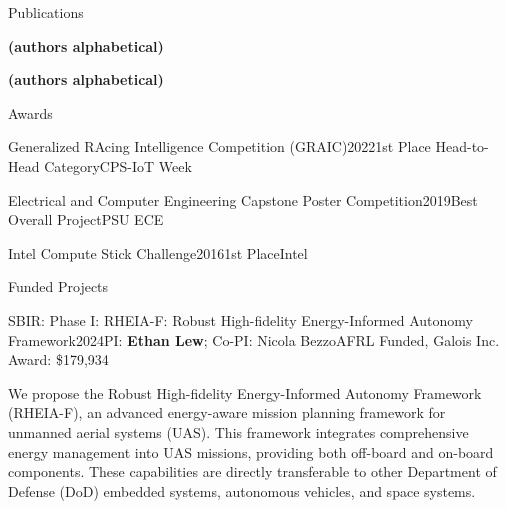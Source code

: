 \documentclass{resume}
\begin{document}
\begin{rSection}{Publications}


\textbf{(authors alphabetical)} 




\textbf{(authors alphabetical)} 

\end{rSection}

\begin{rSection}{Awards}
\begin{rSubsectionEmpty}{Generalized RAcing Intelligence Competition (GRAIC)}{2022}{1st Place Head-to-Head Category}{CPS-IoT Week}\end{rSubsectionEmpty}

\begin{rSubsectionEmpty}{Electrical and Computer Engineering Capstone Poster Competition}{2019}{Best Overall Project}{PSU ECE}\end{rSubsectionEmpty}

\begin{rSubsectionEmpty}{Intel Compute Stick Challenge}{2016}{1st Place}{Intel}\end{rSubsectionEmpty}
\end{rSection}


\begin{rSection}{Funded Projects}
\begin{rSubsection}{SBIR: Phase I: RHEIA-F: Robust High-fidelity Energy-Informed Autonomy Framework}{2024}{PI: \textbf{Ethan Lew}; Co-PI: Nicola Bezzo}{AFRL Funded, Galois Inc. Award: \$179,934}
\item We propose the Robust High-fidelity Energy-Informed Autonomy Framework (RHEIA-F), an advanced energy-aware mission planning framework for unmanned aerial systems (UAS). This framework integrates comprehensive energy management into UAS missions, providing both off-board and on-board components. These capabilities are directly transferable to other Department of Defense (DoD) embedded systems, autonomous vehicles, and space systems.
\end{rSubsection}
\end{rSection}
\end{document}
